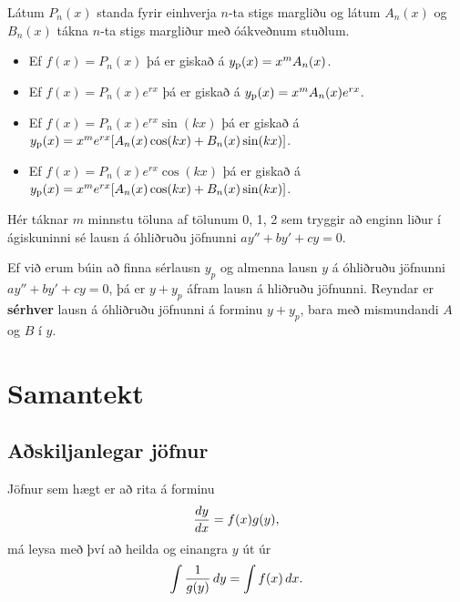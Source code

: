 \documentclass[a4paper,10pt,icelandic]{sphinxmanual}
\begin{document}
Látum \(P_n(x)\) standa fyrir einhverja \(n\)-ta stigs margliðu
og látum \(A_n(x)\) og \(B_n(x)\) tákna \(n\)-ta stigs
margliður með óákveðnum stuðlum.
\begin{itemize}
\item {} 
Ef \(f(x)=P_n(x)\) þá er giskað á \(y_{\rm p}(x)=x^mA_n(x)\).

\item {} 
Ef \(f(x)=P_n(x)e^{rx}\) þá er giskað á
\(y_{\rm p}(x)=x^mA_n(x)e^{rx}\).

\item {} 
Ef \(f(x)=P_n(x)e^{rx}\sin(kx)\) þá er giskað á
\(y_{\rm p}(x)=x^me^{rx}[A_n(x)\cos(kx)+B_n(x)\sin(kx)]\).

\item {} 
Ef \(f(x)=P_n(x)e^{rx}\cos(kx)\) þá er giskað á
\(y_{\rm p}(x)=x^me^{rx}[A_n(x)\cos(kx)+B_n(x)\sin(kx)]\).

\end{itemize}

Hér táknar \(m\) minnstu töluna af tölunum 0, 1, 2 sem tryggir að
enginn liður í ágiskuninni sé lausn á óhliðruðu jöfnunni
\(ay''+by'+cy=0\).

Ef við erum búin að finna sérlausn \(y_p\) og almenna lausn
\(y\) á óhliðruðu jöfnunni \(ay''+by'+cy=0\), þá er
\(y+y_p\) áfram lausn á hliðruðu jöfnunni. Reyndar er \textbf{sérhver}
lausn á óhliðruðu jöfnunni á forminu \(y+y_p\), bara
með mismundandi \(A\) og \(B\) í \(y\).


\section{Samantekt}
\label{kafli08:index-8}\label{kafli08:samantekt}

\subsection{Aðskiljanlegar jöfnur}
\label{kafli08:askiljanlegar-jofnur}
Jöfnur sem hægt er að rita á forminu
\begin{gather}
\begin{split}\frac{dy}{dx} = f(x)g(y),\end{split}\notag
\end{gather}
má leysa með því að heilda og einangra \(y\) út úr
\begin{gather}
\begin{split}\int \frac 1{g(y)}\, dy = \int f(x)\, dx.\end{split}\notag
\end{gather}
\end{document}

